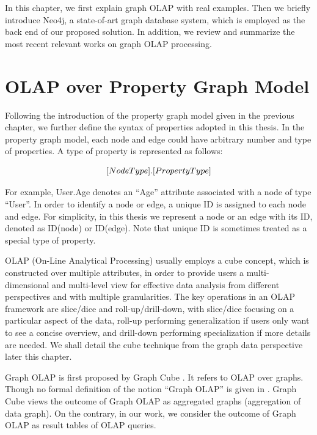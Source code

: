 In this chapter, we first explain graph OLAP with real examples. Then we briefly introduce Neo4j, a state-of-art graph database system, which is employed as the back end of our proposed solution. In addition, we review and summarize the most recent relevant works on graph OLAP processing.


\section{OLAP over Property Graph Model}


Following the introduction of the property graph model given in the previous chapter, we further define the syntax of properties adopted in this thesis. In the property graph model, each node and edge could have arbitrary number and type of properties. A type of property is represented as follows:

\begin{displaymath}
\centering
[NodeType].[PropertyType]
\end{displaymath}

For example, User.Age denotes an ``Age'' attribute associated with a node of type ``User''. In order to identify a node or edge, a unique ID is assigned to each node and edge.  For simplicity, in this thesis we represent a node or an edge with its ID, denoted as ID(node) or ID(edge). Note that unique ID is sometimes treated as a special type of property.


OLAP (On-Line Analytical Processing) \cite{DBLP:conf/sigmod/BeyerR99, DBLP:journals/datamine/GrayCBLRVPP97, DBLP:conf/sigmod/ZhaoDN97} usually employs a cube concept, which is constructed over multiple attributes, in order to provide users a multi-dimensional and multi-level view for effective data analysis from different perspectives and with multiple granularities. The key operations in an OLAP framework are slice/dice and roll-up/drill-down, with slice/dice focusing on a particular aspect of the data, roll-up performing generalization if users only want to see a concise overview, and drill-down performing specialization if more details are needed. We shall detail the cube technique from the graph data perspective later this chapter.

 Graph OLAP is first proposed by Graph Cube \cite{DBLP:conf/sigmod/ZhaoLXH11}. It refers to OLAP over graphs. Though no formal definition of the notion ``Graph OLAP'' is given in \cite{DBLP:conf/sigmod/ZhaoLXH11}. Graph Cube \cite{DBLP:conf/sigmod/ZhaoLXH11} views the outcome of Graph OLAP as aggregated graphs (aggregation of data graph). On the contrary, in our work, we consider the outcome of Graph OLAP as result tables of OLAP queries.


